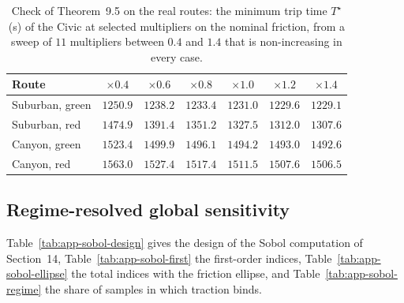 \documentclass[12pt, twoside]{amsart}
\theoremstyle{definition}
\newcommand{\mainref}[2]{#2}
\begin{document}
\begin{table}[htbp]
\centering\small
\setlength{\tabcolsep}{4pt}
\caption{Check of Theorem~\mainref{thm:transit}{9.5} on the real routes: the minimum trip time $T^\star$ (s) of the Civic at selected multipliers on the nominal friction, from a sweep of $11$ multipliers between $0.4$ and $1.4$ that is non-increasing in every case.}\label{tab:app-routemono}
\begin{tabular}{lcccccc}
\toprule
Route & $\times0.4$ & $\times0.6$ & $\times0.8$ & $\times1.0$ & $\times1.2$ & $\times1.4$\\
\midrule
Suburban, green & $1250.9$ & $1238.2$ & $1233.4$ & $1231.0$ & $1229.6$ & $1229.1$\\
Suburban, red & $1474.9$ & $1391.4$ & $1351.2$ & $1327.5$ & $1312.0$ & $1307.6$\\
Canyon, green & $1523.4$ & $1499.9$ & $1496.1$ & $1494.2$ & $1493.0$ & $1492.6$\\
Canyon, red & $1563.0$ & $1527.4$ & $1517.4$ & $1511.5$ & $1507.6$ & $1506.5$\\
\bottomrule
\end{tabular}
\end{table}
\FloatBarrier

\subsection{Regime-resolved global sensitivity}

Table~\ref{tab:app-sobol-design} gives the design of the Sobol computation of
Section~\mainref{sec:sobol}{14}, Table~\ref{tab:app-sobol-first} the first-order indices,
Table~\ref{tab:app-sobol-ellipse} the total indices with the friction ellipse, and
Table~\ref{tab:app-sobol-regime} the share of samples in which traction binds.
\end{document}
